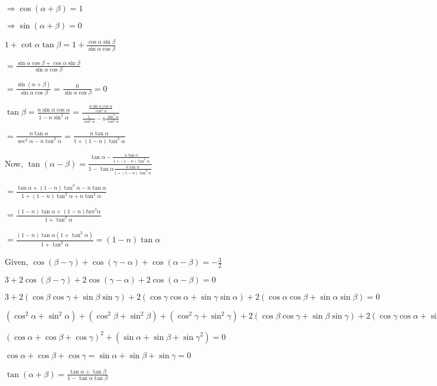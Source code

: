   $\Rightarrow \cos(\alpha + \beta) = 1$

  $\Rightarrow  \sin(\alpha + \beta) = 0$

  $1 + \cot\alpha\tan\beta = 1 + \frac{\cos\alpha\sin\beta}{\sin\alpha\cos\beta}$

  $= \frac{\sin\alpha\cos\beta + \cos\alpha\sin\beta}{\sin\alpha\cos\beta}$

  $= \frac{\sin(\alpha + \beta)}{\sin\alpha\cos\beta} = \frac{0}{\sin\alpha\cos\beta} = 0$

\item $\tan\beta = \frac{n\sin\alpha\cos\alpha}{1 - n\sin^2\alpha} =
  \frac{\frac{n\sin\alpha\cos\alpha}{\cos^2\alpha}}{\frac{1}{\cos^2\alpha} - n\frac{\sin^2\alpha}{\cos^2\alpha}}$

  $= \frac{n\tan\alpha}{\sec^2\alpha - n\tan^2\alpha} = \frac{n\tan\alpha}{1 + (1 - n)\tan^2\alpha}$

  Now, $\tan(\alpha - \beta) = \frac{\tan\alpha - \frac{n\tan\alpha}{1 + (1 - n)\tan^2\alpha}}{1 -
    \tan\alpha\frac{n\tan\alpha}{1 + (1 - n)\tan^2\alpha}}$

  $= \frac{\tan\alpha + (1 - n)\tan^3\alpha - n\tan\alpha}{1 + (1 - n)\tan^2\alpha + n\tan^2\alpha}$

  $= \frac{(1 - n)\tan\alpha + (1 - n)tan^3\alpha}{1 + \tan^2\alpha}$

  $= \frac{(1 - n)\tan\alpha(1 + \tan^2\alpha)}{ 1 + \tan^2\alpha} = (1 - n)\tan\alpha$

\item Given, $\cos(\beta - \gamma) + \cos(\gamma - \alpha) + \cos(\alpha - \beta) = -\frac{3}{2}$

  $3 + 2\cos(\beta - \gamma) + 2\cos(\gamma - \alpha) + 2\cos(\alpha - \beta) = 0$

  $3 + 2(\cos\beta\cos\gamma + \sin\beta\sin\gamma) + 2(\cos\gamma\cos\alpha + \sin\gamma\sin\alpha) +
  2(\cos\alpha\cos\beta + \sin\alpha\sin\beta) = 0$

  $(\cos^2\alpha + \sin^2\alpha) + (\cos^2\beta + \sin^2\beta) + (\cos^2\gamma + \sin^2\gamma) + 2(\cos\beta\cos\gamma +
  \sin\beta\sin\gamma) + 2(\cos\gamma\cos\alpha + \sin\gamma\sin\alpha) + 2(\cos\alpha\cos\beta + \sin\alpha\sin\beta) = 0$

  $(\cos\alpha + \cos\beta + \cos\gamma)^2 + (\sin\alpha + \sin\beta + \sin\gamma^2) = 0$

  $\cos\alpha + \cos\beta + \cos\gamma = \sin\alpha + \sin\beta + \sin\gamma = 0$

\item $\tan(\alpha + \beta) = \frac{\tan\alpha + \tan\beta}{1 - \tan\alpha\tan\beta}$

